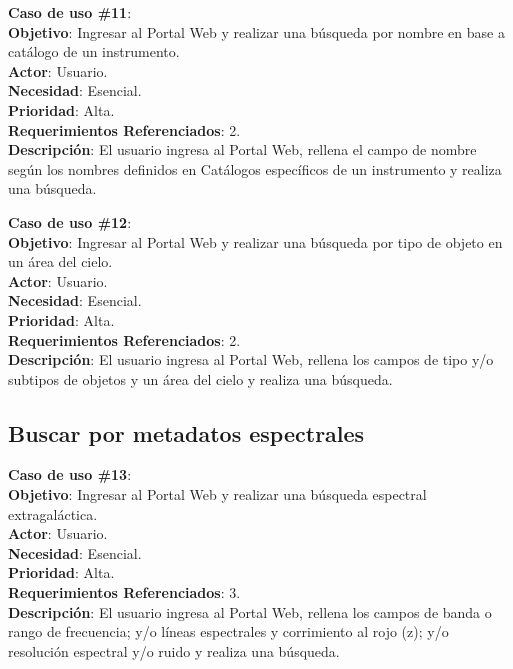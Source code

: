 \noindent\textbf{Caso de uso \#11}: \\
\noindent\textbf{Objetivo}: Ingresar al Portal Web y realizar una búsqueda por nombre en base a catálogo de un instrumento. \\
\textbf{Actor}: Usuario.\\
\textbf{Necesidad}: Esencial.\\
\textbf{Prioridad}: Alta.\\
\textbf{Requerimientos Referenciados}: 2. \\
\textbf{Descripción}: El usuario ingresa al Portal Web, rellena el campo de nombre según los nombres definidos en Catálogos específicos de un instrumento y realiza una búsqueda.
\vspace{1.0cm}

\noindent\textbf{Caso de uso \#12}: \\
\noindent\textbf{Objetivo}: Ingresar al Portal Web y realizar una búsqueda por tipo de objeto en un área del cielo. \\
\textbf{Actor}: Usuario.\\
\textbf{Necesidad}: Esencial.\\
\textbf{Prioridad}: Alta.\\
\textbf{Requerimientos Referenciados}: 2. \\
\textbf{Descripción}: El usuario ingresa al Portal Web, rellena los campos de tipo y/o subtipos de objetos y un área del cielo y realiza una búsqueda.
\vspace{1.0cm}

\subsection{Buscar por metadatos espectrales}
\noindent\textbf{Caso de uso \#13}: \\
\noindent\textbf{Objetivo}: Ingresar al Portal Web y realizar una búsqueda espectral extragaláctica. \\
\textbf{Actor}: Usuario.\\
\textbf{Necesidad}: Esencial.\\
\textbf{Prioridad}: Alta.\\
\textbf{Requerimientos Referenciados}: 3. \\
\textbf{Descripción}: El usuario ingresa al Portal Web, rellena los campos de banda o rango de frecuencia;  y/o líneas espectrales y corrimiento al rojo (z); y/o resolución espectral y/o ruido y realiza una búsqueda.
\vspace{1.0cm}

